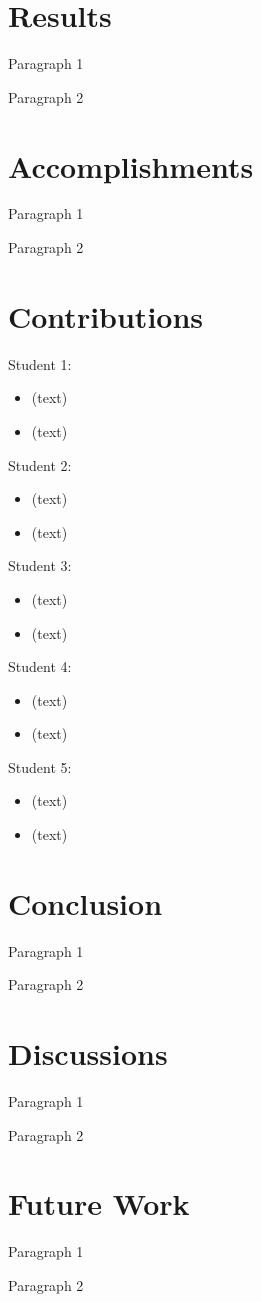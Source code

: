 \documentclass[12pt, a4paper]{report}
\begin{document}
\section{Results}
Paragraph 1

Paragraph 2

\section{Accomplishments}
Paragraph 1

Paragraph 2

\section{Contributions}
Student 1:
\begin{itemize}
  \item (text)
  \item (text)
\end{itemize}
Student 2:
\begin{itemize}
  \item (text)
  \item (text)
\end{itemize}
Student 3:
\begin{itemize}
  \item (text)
  \item (text)
\end{itemize}
Student 4:
\begin{itemize}
  \item (text)
  \item (text)
\end{itemize}
Student 5:
\begin{itemize}
  \item (text)
  \item (text)
\end{itemize}

\section{Conclusion}
Paragraph 1

Paragraph 2

\section{Discussions}
Paragraph 1

Paragraph 2

\section{Future Work}
Paragraph 1

Paragraph 2
\end{document}
